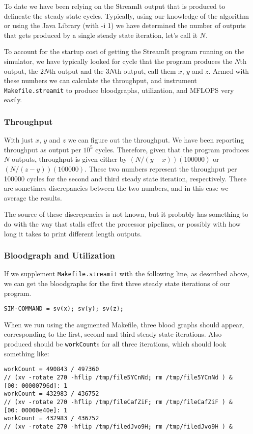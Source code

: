 \documentclass{article}
\begin{document}
To date we have been relying on the StreamIt output that is produced 
to delineate the steady state cycles. Typically, using our knowledge of
the algorithm or using the Java Library (with -i 1) we have determined the
number of outputs that gets produced by a single steady state iteration, let's call
it $N$.

To account for the startup cost of getting the StreamIt program running on
the simulator, we have typically looked for cycle that the program produces
the $N$th output, the $2N$th output and the $3N$th output, call them $x$, $y$ and $z$. 
Armed with these numbers we can calculate the throughput, and instrument
\texttt{Makefile.streamit} to produce bloodgraphs, utilization, and MFLOPS very easily. 

\subsubsection{Throughput} 
With just $x$, $y$ and $z$ we can figure out the throughput. We have been reporting
throughput as output per $10^5$ cycles. Therefore, given that the program produces
$N$ outputs, throughput is given either by $(N/(y-x))(100000)$ or $(N/(z-y))(100000)$.
These two numbers represent the throughput per 100000 cycles for the second and third
steady state iteration, respectively. There are sometimes discrepancies between the two 
numbers, and in this case we average the results.

The source of these discrepencies is not known, but it probably has something to do with
the way that stalls effect the processor pipelines, or possibly with how long it takes to
print different length outputs.

\subsubsection{Bloodgraph and Utilization} 
If we supplement \texttt{Makefile.streamit} with the following line, as described above,
we can get the bloodgraphs for the first three steady state iterations of
our program.
\begin{verbatim}SIM-COMMAND = sv(x); sv(y); sv(z);\end{verbatim} 

When we run using the augmented Makefile, three blood graphs should appear, 
corresponding to the first, second and third steady state iterations.
Also produced should be \texttt{workCount}s for all three iterations, which
should look something like:
\begin{verbatim}
workCount = 490843 / 497360
// (xv -rotate 270 -hflip /tmp/file5YCnNd; rm /tmp/file5YCnNd ) &
[00: 00000796d]: 1
workCount = 432983 / 436752
// (xv -rotate 270 -hflip /tmp/fileCafZiF; rm /tmp/fileCafZiF ) &
[00: 00000e40e]: 1
workCount = 432983 / 436752
// (xv -rotate 270 -hflip /tmp/filedJvo9H; rm /tmp/filedJvo9H ) &
\end{verbatim} 
\end{document}
